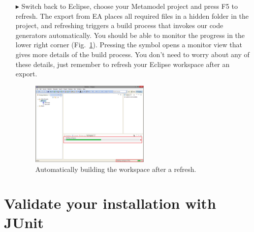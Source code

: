 \begin{enumerate}
\item[$\blacktriangleright$] Switch back to Eclipse, choose your Metamodel project and press F5 to refresh.
The export from EA places all required files in a hidden folder in the project, and refreshing triggers a build process that invokes our code generators automatically.
You should be able to monitor the progress in the lower right corner (Fig.~\ref{fig_eclipsebuilding}).  
Pressing the symbol opens a monitor view that gives more details of the build process. 
You don't need to worry about any of these details, just remember to refresh your Eclipse workspace after an export.
\begin{figure}[htbp]
	\centering
  \includegraphics[width=0.55\textwidth]{pics/installationAndSetup/eclipse_building.png}
	\caption{Automatically building the workspace after a refresh.}
	\label{fig_eclipsebuilding}
\end{figure}
\end{enumerate}

\section{Validate your installation with JUnit}
\label{sec:junit}

